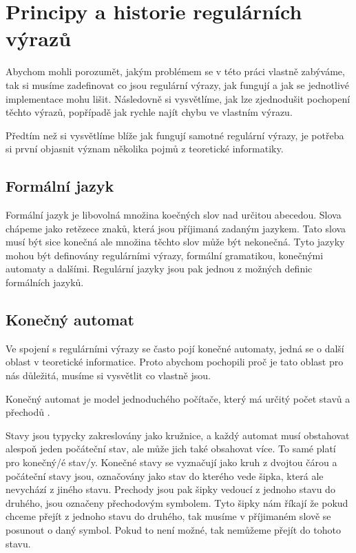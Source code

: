 \chapter{Principy a historie regulárních výrazů}\label{sec:Principle}

Abychom mohli porozumět, jakým problémem se v této práci vlastně zabýváme, tak si musíme zadefinovat co jsou
regulární výrazy, jak fungují a jak se jednotlivé implementace mohu lišit. Následovně si vysvětlíme, jak lze zjednodušit
pochopení těchto výrazů, popřípadě jak rychle najít chybu ve vlastním výrazu. 

Předtím než si vysvětlíme blíže jak fungují samotné regulární výrazy, je potřeba si první objasnit význam několika pojmů z teoretické informatiky.

\section{Formální jazyk}
Formální jazyk je libovolná množina koečných slov nad určitou abecedou. 
Slova chápeme jako retězece znaků, která jsou příjimaná zadaným jazykem.
Tato slova musí být sice konečná ale množina těchto slov může být nekonečná. 
Tyto jazyky mohou být definovány regulárními výrazy, formální gramatikou,
konečnými automaty a dalšími. Regulární jazyky jsou pak jednou z možných definic formálních jazyků.

\section{Konečný automat}
Ve spojení s regulárními výrazy se často pojí konečné automaty, jedná se o další oblast v teoretické informatice.
Proto abychom pochopili proč je tato oblast pro nás důležitá, musíme si vysvětlit co vlastně jsou.

Konečný automat je model jednoduchého počítače, který má určitý počet stavů a přechodů \cite{Havrlant}. 

Stavy jsou typycky zakreslovány jako kružnice, a každý automat musí obstahovat alespoň jeden počáteční stav,
ale může jich také obsahovat více. To samé platí pro konečný/é stav/y. Konečné stavy se vyznačují jako kruh z dvojtou čárou a počáteční stavy jsou, 
označovány jako stav do kterého vede šipka, která ale nevychází z jiného stavu.
Prechody jsou pak šipky vedoucí z jednoho stavu do druhého, jsou označeny přechodovým symbolem.
Tyto šipky nám říkají že pokud chceme přejít z jednoho stavu do druhého, tak musíme v příjimaném slově se posunout o
daný symbol. Pokud to není možné, tak nemůžeme přejít do tohoto stavu.

